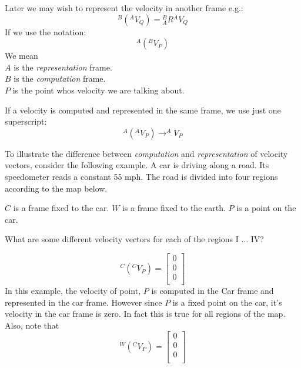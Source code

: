 Later we may wish to  represent the velocity in another frame
e.g.:
\[
^B(^AV_Q) = {^B_AR} {^AV_Q}
\]
If we use the notation:
\[
^A(^BV_P)
\]
We mean\\
$A$ is the {\it representation} frame. \\
$B$ is the {\it computation} frame. \\
$P$ is the point whos velocity we are talking about.

If a velocity is computed and represented in the same frame, we use just one
superscript:
\[
^A(^AV_P) \to ^AV_P
\]


\begin{Example}
To illustrate the difference between {\it computation} and {\it representation}
of velocity vectors, consider the following example.   A car is driving along a road.
Its speedometer reads a constant 55 mph.  The road is divided into four regions according to the map below.

\vspace{0.15in}
\begin{center}
\end{center}

$C$ is a frame fixed to the car.  $W$ is a frame fixed to the earth.  $P$ is a point on the car.

What are some different velocity vectors for each of the regions I ... IV?

\[
^C(^CV_P) = \left [
\begin{array}{c}
0 \\
0 \\
0 \\
\end{array}
\right ]
\]
In this example, the velocity of point, $P$ is computed in the Car frame and represented in the car frame.   However since $P$ is a fixed point on the car, it's velocity in the car frame is zero.  In fact this is true for all regions of the map.
Also, note that
\[
^W(^CV_P) =
\left [
\begin{array}{c}
0 \\
0 \\
0 \\
\end{array}
\right ]
\]


\end{Example}
